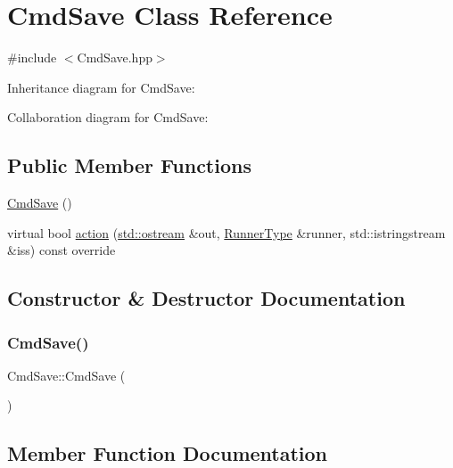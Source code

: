 \hypertarget{classCmdSave}{}\section{Cmd\+Save Class Reference}
\label{classCmdSave}


{\ttfamily \#include $<$Cmd\+Save.\+hpp$>$}



Inheritance diagram for Cmd\+Save\+:


Collaboration diagram for Cmd\+Save\+:
\subsection*{Public Member Functions}
\begin{DoxyCompactItemize}
\item 
\hyperlink{classCmdSave_a43da9362bbde62dc222f3fb0ba6f2b29}{Cmd\+Save} ()
\item 
virtual bool \hyperlink{classCmdSave_a44fb7fe716f0d65f597e7eccb647ba3d}{action} (\hyperlink{doctest_8h_a116af65cb5e924b33ad9d9ecd7a783f3}{std\+::ostream} \&out, \hyperlink{Command_8hpp_ad45c3de597c2023a8be0399d914161f4}{Runner\+Type} \&runner, std\+::istringstream \&iss) const override
\end{DoxyCompactItemize}


\subsection{Constructor \& Destructor Documentation}
\mbox{\label{classCmdSave_a43da9362bbde62dc222f3fb0ba6f2b29}} 
\subsubsection{\texorpdfstring{Cmd\+Save()}{CmdSave()}}
{\footnotesize\ttfamily Cmd\+Save\+::\+Cmd\+Save (\begin{DoxyParamCaption}{ }\end{DoxyParamCaption})}



\subsection{Member Function Documentation}
\mbox{\label{classCmdSave_a44fb7fe716f0d65f597e7eccb647ba3d}} 
